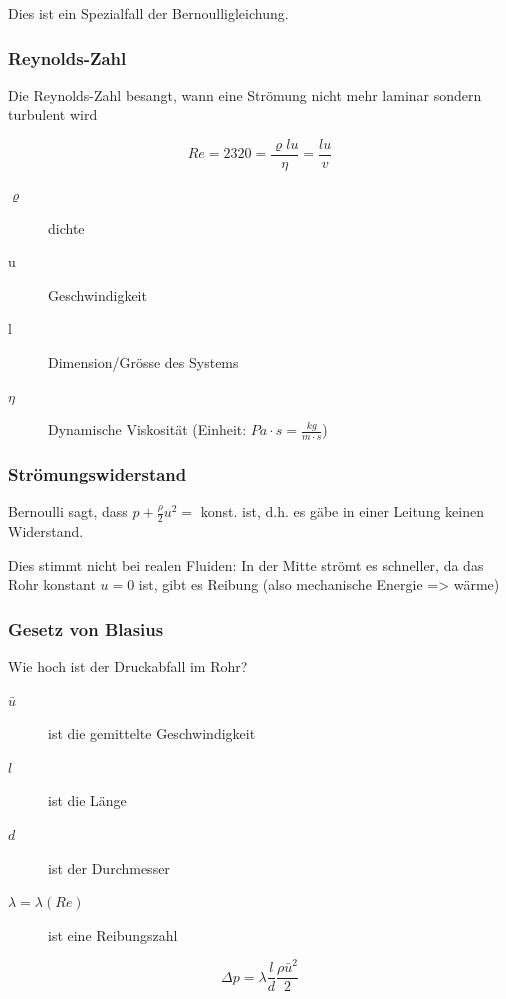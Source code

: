 \documentclass[a4paper]{scrartcl}
\begin{document}
Dies ist ein Spezialfall der Bernoulligleichung.

\subsubsection{Reynolds-Zahl}

Die Reynolds-Zahl besangt, wann eine Strömung nicht mehr laminar sondern turbulent wird

\[
	Re = 2320 = \frac{\varrho lu}{\eta} = \frac{lu}{v}
\]

\begin{description}
\item[$\varrho$] dichte
\item[u] Geschwindigkeit
\item[l] Dimension/Grösse des Systems
\item[$\eta$] Dynamische Viskosität (Einheit: $Pa \cdot s = \frac{kg}{m \cdot s}$)
\end{description}


\subsubsection{Strömungswiderstand}

Bernoulli sagt, dass $p + \frac{\rho}{2} u^2 =$ konst. ist, d.h. es gäbe in einer Leitung keinen Widerstand.

Dies stimmt nicht bei realen Fluiden: In der Mitte strömt es schneller, da das Rohr konstant $u=0$ ist, gibt es Reibung (also mechanische Energie => wärme)


\subsubsection{Gesetz von Blasius}

Wie hoch ist der Druckabfall im Rohr?

\begin{description}
	\item[$\bar{u}$] ist die gemittelte Geschwindigkeit
	\item[$l$] ist die Länge
	\item[$d$] ist der Durchmesser
	\item[$\lambda = \lambda(Re)$] ist eine Reibungszahl %
\end{description}

\[
	\Delta p = \lambda \frac{l}{d}\frac{\rho \bar{u}^2}{2}
\]
\end{document}
